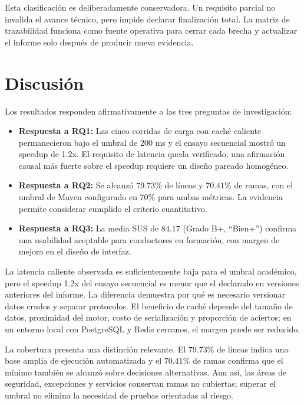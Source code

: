 \documentclass[11pt,a4paper]{report}
\begin{document}
Esta clasificación es deliberadamente conservadora. Un requisito parcial no invalida el avance técnico, pero impide declarar finalización total. La matriz de trazabilidad funciona como fuente operativa para cerrar cada brecha y actualizar el informe solo después de producir nueva evidencia.

\chapter{Discusión}
Los resultados responden afirmativamente a las tres preguntas de investigación:
\begin{itemize}
    \item \textbf{Respuesta a RQ1:} Las cinco corridas de carga con caché caliente permanecieron bajo el umbral de 200 ms y el ensayo secuencial mostró un speedup de 1.2x. El requisito de latencia queda verificado; una afirmación causal más fuerte sobre el speedup requiere un diseño pareado homogéneo.
    \item \textbf{Respuesta a RQ2:} Se alcanzó $79.73\%$ de líneas y $70.41\%$ de ramas, con el umbral de Maven configurado en 70\% para ambas métricas. La evidencia permite considerar cumplido el criterio cuantitativo.
    \item \textbf{Respuesta a RQ3:} La media SUS de $84.17$ (Grado B+, ``Bien+'') confirma una usabilidad aceptable para conductores en formación, con margen de mejora en el diseño de interfaz.
\end{itemize}

La latencia caliente observada es suficientemente baja para el umbral académico, pero el speedup 1.2x del ensayo secuencial es menor que el declarado en versiones anteriores del informe. La diferencia demuestra por qué es necesario versionar datos crudos y separar protocolos. El beneficio de caché depende del tamaño de datos, proximidad del motor, costo de serialización y proporción de aciertos; en un entorno local con PostgreSQL y Redis cercanos, el margen puede ser reducido.

La cobertura presenta una distinción relevante. El $79.73\%$ de líneas indica una base amplia de ejecución automatizada y el $70.41\%$ de ramas confirma que el mínimo también se alcanzó sobre decisiones alternativas. Aun así, las áreas de seguridad, excepciones y servicios conservan ramas no cubiertas; superar el umbral no elimina la necesidad de pruebas orientadas al riesgo.
\end{document}
